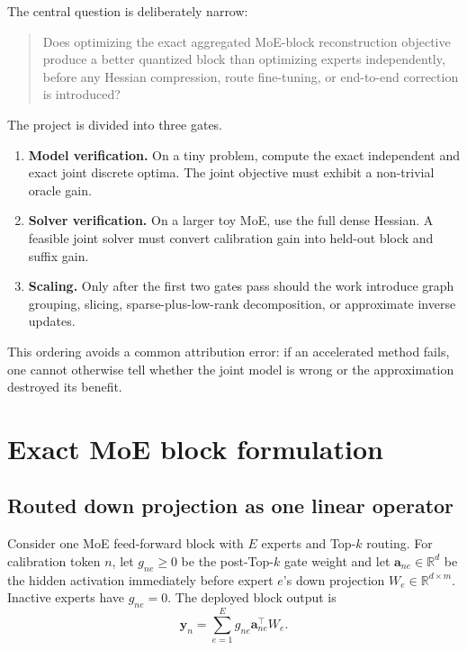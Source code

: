 \documentclass[11pt]{article}
\theoremstyle{plain}
\theoremstyle{definition}
\theoremstyle{remark}
\newcommand{\R}{\mathbb{R}}
\begin{document}
The central question is deliberately narrow:

\begin{quote}
Does optimizing the exact aggregated MoE-block reconstruction objective produce a better quantized block than optimizing experts independently, before any Hessian compression, route fine-tuning, or end-to-end correction is introduced?
\end{quote}

The project is divided into three gates.

\begin{enumerate}
  \item \textbf{Model verification.} On a tiny problem, compute the exact independent and exact joint discrete optima.  The joint objective must exhibit a non-trivial oracle gain.
  \item \textbf{Solver verification.} On a larger toy MoE, use the full dense Hessian.  A feasible joint solver must convert calibration gain into held-out block and suffix gain.
  \item \textbf{Scaling.} Only after the first two gates pass should the work introduce graph grouping, slicing, sparse-plus-low-rank decomposition, or approximate inverse updates.
\end{enumerate}

This ordering avoids a common attribution error: if an accelerated method fails, one cannot otherwise tell whether the joint model is wrong or the approximation destroyed its benefit.

\section{Exact MoE block formulation}

\subsection{Routed down projection as one linear operator}

Consider one MoE feed-forward block with $E$ experts and Top-$k$ routing.  For calibration token $n$, let $g_{ne}\ge 0$ be the post-Top-$k$ gate weight and let $\bm a_{ne}\in\R^d$ be the hidden activation immediately before expert $e$'s down projection $W_e\in\R^{d\times m}$.  Inactive experts have $g_{ne}=0$.  The deployed block output is
\begin{equation}\label{eq:moe-output}
  \bm y_n=\sum_{e=1}^{E}g_{ne}\bm a_{ne}^{\!\top}W_e.
\end{equation}
\end{document}

